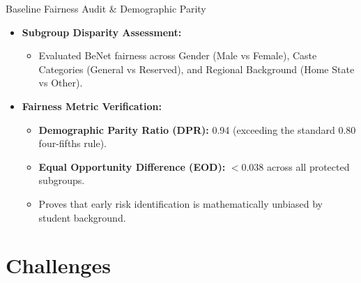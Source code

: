 \documentclass{beamer}
\begin{document}
\begin{frame}{Baseline Fairness Audit \& Demographic Parity}
  \begin{itemize}\setlength{\itemsep}{8pt}
    \item \textbf{Subgroup Disparity Assessment:}
    \begin{itemize}\setlength{\itemsep}{3pt}
      \item Evaluated BeNet fairness across Gender (Male vs Female), Caste Categories (General vs Reserved), and Regional Background (Home State vs Other).
    \end{itemize}
    
    \item \textbf{Fairness Metric Verification:}
    \begin{itemize}\setlength{\itemsep}{3pt}
      \item \textbf{Demographic Parity Ratio (DPR):} 0.94 (exceeding the standard 0.80 four-fifths rule).
      \item \textbf{Equal Opportunity Difference (EOD):} $< 0.038$ across all protected subgroups.
      \item Proves that early risk identification is mathematically unbiased by student background.
    \end{itemize}
  \end{itemize}
\end{frame}

\section{Challenges}
\end{document}
